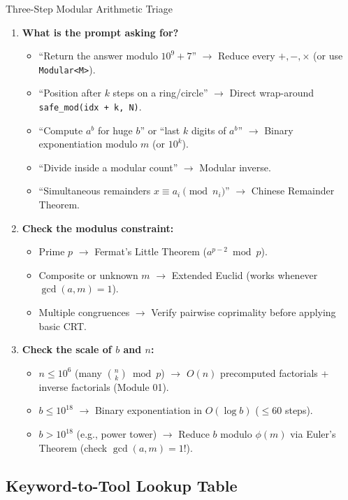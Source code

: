 \documentclass[11pt,a4paper]{article}
\theoremstyle{definition}
\begin{document}
\begin{calloutbox}{Three-Step Modular Arithmetic Triage}
\begin{enumerate}
    \item \textbf{What is the prompt asking for?}
    \begin{itemize}
        \item ``Return the answer modulo $10^9 + 7$'' $\to$ Reduce every $+, -, \times$ (or use \texttt{Modular<M>}).
        \item ``Position after $k$ steps on a ring/circle'' $\to$ Direct wrap-around \texttt{safe\_mod(idx + k, N)}.
        \item ``Compute $a^b$ for huge $b$'' or ``last $k$ digits of $a^b$'' $\to$ Binary exponentiation modulo $m$ (or $10^k$).
        \item ``Divide inside a modular count'' $\to$ Modular inverse.
        \item ``Simultaneous remainders $x \equiv a_i \pmod{n_i}$'' $\to$ Chinese Remainder Theorem.
    \end{itemize}
    \item \textbf{Check the modulus constraint:}
    \begin{itemize}
        \item Prime $p$ $\to$ Fermat's Little Theorem ($a^{p-2} \bmod p$).
        \item Composite or unknown $m$ $\to$ Extended Euclid (works whenever $\gcd(a, m) = 1$).
        \item Multiple congruences $\to$ Verify pairwise coprimality before applying basic CRT.
    \end{itemize}
    \item \textbf{Check the scale of $b$ and $n$:}
    \begin{itemize}
        \item $n \le 10^6$ (many $\binom{n}{k} \bmod p$) $\to$ $O(n)$ precomputed factorials + inverse factorials (Module 01).
        \item $b \le 10^{18}$ $\to$ Binary exponentiation in $O(\log b)$ ($\le 60$ steps).
        \item $b > 10^{18}$ (e.g., power tower) $\to$ Reduce $b$ modulo $\phi(m)$ via Euler's Theorem (check $\gcd(a, m) = 1$!).
    \end{itemize}
\end{enumerate}
\end{calloutbox}

\subsection*{Keyword-to-Tool Lookup Table}
\end{document}
